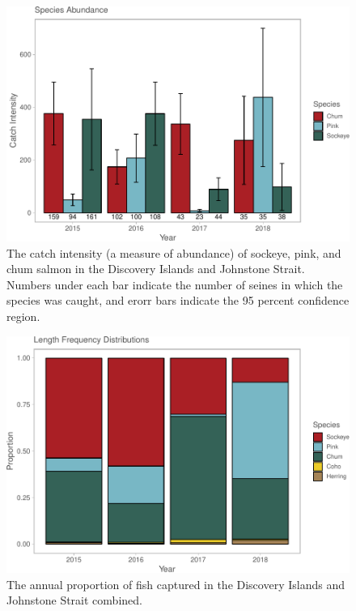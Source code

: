 \documentclass[fleqn,10pt]{wlpeerj} %
\begin{document}
\begin{figure}[H]
\includegraphics[width=0.9\linewidth]{Migration_Observations_Report_files/figure-latex/catchintensity-1} \caption{The catch intensity (a measure of abundance) of sockeye, pink, and chum salmon in the Discovery Islands and Johnstone Strait. Numbers under each bar indicate the number of seines in which the species was caught, and erorr bars indicate the 95 percent confidence region.}\label{fig:catchintensity}
\end{figure}

\begin{figure}[H]
\includegraphics[width=0.9\linewidth]{Migration_Observations_Report_files/figure-latex/prop-1} \caption{The annual proportion of fish captured in the Discovery Islands and Johnstone Strait combined.}\label{fig:prop}
\end{figure}
\end{document}
